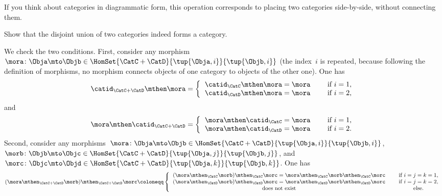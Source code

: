 {\begin{remark}
	If you think about categories in diagrammatic form, this operation corresponds to placing two categories side-by-side, without connecting them.
\end{remark}

\begin{exercise}
	Show that the disjoint union of two categories indeed forms a category.
\end{exercise}
\begin{solution}
	We check the two conditions.
	First, consider any morphism~$\mora\colon \Obja \mto \Objb\in \HomSet{\CatC + \CatD}{\tup{\Obja, i}}{\tup{\Objb, i}}$ (the index~$i$ is repeated, because following the definition of morphisms, no morphism connects objects of one category to objects of the other one).
	One has
	\begin{equation*}
	\catid_{\CatC+\CatD}\mthen \mora=
	\left\{
	\begin{tabular}{ccc}
	$\catid_\CatC\mthen \mora=\mora$ & & if $i=1$, \\
	$\catid_\CatD\mthen \mora=\mora$ & & if $i=2$,
	\end{tabular}
	\right.
	\end{equation*}
	and
	\begin{equation*}
\mora \mthen \catid_{\CatC+\CatD}=
\left\{
\begin{tabular}{ccc}
$\mora \mthen \catid_\CatC=\mora$ & & if $i=1$, \\
$\mora \mthen \catid_\CatD=\mora$ & & if $i=2$.
\end{tabular}
\right.
\end{equation*}
Second, consider any morphisms~$\mora\colon \Obja \mto \Objb\in \HomSet{\CatC + \CatD}{\tup{\Obja, i}}{\tup{\Objb, i}}$,~$\morb\colon \Objb \mto \Objc\in \HomSet{\CatC + \CatD}{\tup{\Obja, j}}{\tup{\Objb, j}}$, and~$\morc\colon \Objc \mto \Objd\in \HomSet{\CatC + \CatD}{\tup{\Obja, k}}{\tup{\Objb, k}}$.
	One has
	\begin{equation}
		(\mora \mthen_{\CatC+\CatD} \morb)\mthen_{\CatC+\CatD} \morc \coloneqq
	\left\{
	\begin{tabular}{ccc}
	$(\mora\mthen_\CatC \morb)\mthen_\CatC \morc= \mora\mthen_\CatC \morb\mthen_\CatC \morc$ & & if $i=j =k= 1$, \\
	$(\mora\mthen_\CatD \morb)\mthen_\CatD \morc= \mora\mthen_\CatD \morb\mthen_\CatD \morc$ & & if $i = j=k =2$, \\
	does not exist	& & else.
	\end{tabular}
	\right.

\end{equation}
\end{solution}}
